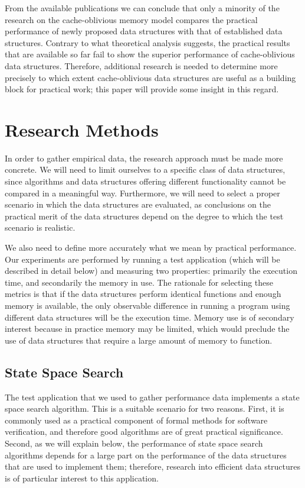 \documentclass{acm_proc_article-sp}
\begin{document}
From the available publications we can conclude that only a minority of the research on the cache-oblivious memory model compares the practical performance of newly proposed data structures with that of established data structures.
Contrary to what theoretical analysis suggests, the practical results that are available so far fail to show the superior performance of cache-oblivious data structures.
Therefore, additional research is needed to determine more precisely to which extent cache-oblivious data structures are useful as a building block for practical work; this paper will provide some insight in this regard.

\section{Research Methods}
In order to gather empirical data, the research approach must be made more concrete. We will need to limit ourselves to a specific class of data structures, since algorithms and data structures offering different functionality cannot be compared in a meaningful way. Furthermore, we will need to select a proper scenario in which the data structures are evaluated, as conclusions on the practical merit of the data structures depend on the degree to which the test scenario is realistic.

We also need to define more accurately what we mean by practical performance.
Our experiments are performed by running a test application (which will be
described in detail below) and measuring two properties: primarily the
execution time, and secondarily the memory in use.
The rationale for selecting these metrics is that if the data structures perform
identical functions and enough memory is available, the only observable
difference in running a program using different data structures will be the
execution time.
Memory use is of secondary interest because in practice memory may be limited,
which would preclude the use of data structures that require a large amount of
memory to function.

\subsection{State Space Search}
The test application that we used to gather performance data implements a state
space search algorithm.
This is a suitable scenario for two reasons.
First, it is commonly used as a practical
component of formal methods for software verification, and therefore good
algorithms are of great practical significance. Second, as we will explain
below, the performance of state space search algorithms depends for a large
part on the performance of the data structures that are used to implement
them; therefore, research into efficient data structures is of particular
interest to this application.
\end{document}
